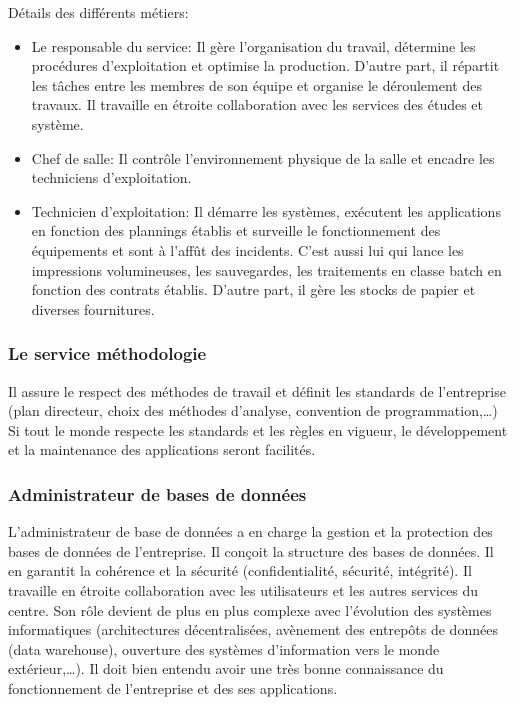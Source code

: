 \documentclass[10pt,a4paper,oneside,titlepage]{report}
\begin{document}
Détails des différents métiers:
\begin{itemize}
\item Le responsable du service: Il gère l’organisation du travail, détermine
les procédures d’exploitation et optimise la production. D'autre part, il
répartit les tâches entre les membres de son équipe et organise le déroulement
des travaux. Il travaille en étroite collaboration avec les services des études
et système.
\item Chef de salle: Il contrôle l’environnement physique de la salle et
encadre les techniciens d’exploitation.
\item Technicien d’exploitation: Il démarre les systèmes, exécutent les
applications en fonction des plannings établis et surveille le fonctionnement
des équipements et sont à l’affût des incidents. C'est aussi lui qui lance les
impressions volumineuses, les sauvegardes, les traitements en classe batch en
fonction des contrats établis. D'autre part, il gère les stocks de papier et
diverses fournitures.
\end{itemize}

\subsubsection{Le service méthodologie}
Il assure le respect des méthodes de travail et définit les standards de
l'entreprise (plan directeur, choix des méthodes d’analyse, convention de
programmation,\dots)\\

Si tout le monde respecte les standards et les règles en vigueur, le
développement et la maintenance des applications seront facilités.

\subsubsection{Administrateur de bases de données}
L’administrateur de base de données a en charge la gestion et la protection des
bases de données de l’entreprise. Il conçoit la structure des bases de données.
Il en garantit la cohérence et la sécurité (confidentialité, sécurité,
intégrité). Il travaille en étroite collaboration avec les utilisateurs et les
autres services du centre. Son rôle devient de plus en plus complexe avec
l’évolution des systèmes informatiques (architectures décentralisées, avènement
des entrepôts de données (data warehouse), ouverture des systèmes d’information
vers le monde extérieur,\dots). Il doit bien entendu avoir une très bonne
connaissance du fonctionnement de l’entreprise et des ses applications.
\end{document}
